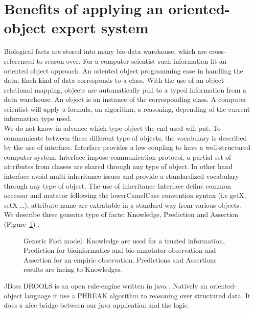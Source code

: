 \documentclass{llncs}
\begin{document}
\section{Benefits of applying an oriented-object expert system}
Biological facts are stored into many bio-data warehouse, which are cross-referenced to reason over. For a computer scientist such information fit an oriented object approach. An oriented object programming ease in handling the data. Each kind of data corresponds to a class. With the use of an object relational mapping, objects are automatically pull to a typed information from a data warehouse. An object is an instance of the corresponding class. A computer scientist will apply a formula, an algorithm, a reasoning, depending of the current information type used. \\
We do not know in advance which type object the end used will put. To communicate between these different type of objects, the vocabulary is described by the use of interface. Interface provides a low coupling to have a well-structured computer system. Interface impose communication protocol, a partial set of attributes from classes are shared through any type of object. In other hand interface avoid multi-inheritance issues and provide a standardized vocabulary through any type of object. The use of inheritance Interface define common accessor and mutator following the lowerCamelCase convention syntax (i.e getX, setX \dots), attribute name are extratable in a standard way from various objects. We describe three generics type of facts: Knowledge, Prediction and Assertion (Figure~\ref{fig:fact}) .

\begin{figure}
    \centering
    \resizebox{0.8\textwidth}{!}{%
        
    }
    \caption{Generic Fact model. Knowledge are used for a trusted information, Prediction for bioinformatics and bio-annotator observation and Assertion for an empiric observation. Predictions and Assertions results are facing to Knowledges.}
    \label{fig:fact}
\end{figure}

JBoss DROOLS is an open rule-engine written in java \cite{proctor2008drools}. Natively an oriented-object language it use a PHREAK algorithm \cite{phreak} to reasoning over structured data. It does a nice bridge between our java application and the logic.
\end{document}
